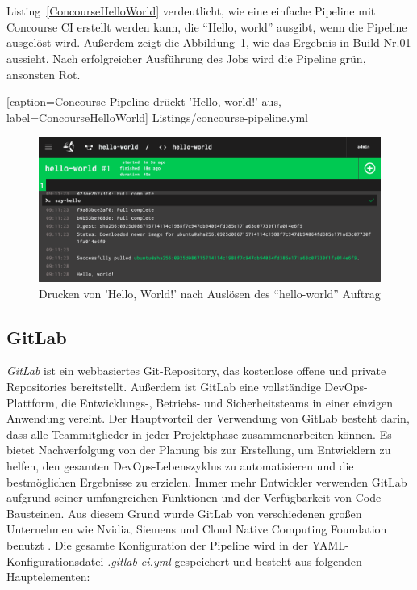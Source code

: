 \ \\\\
Listing~\ref{ConcourseHelloWorld} verdeutlicht, wie eine einfache Pipeline mit Concourse CI erstellt werden kann, die “Hello, world” ausgibt, wenn die Pipeline ausgelöst wird. Außerdem zeigt die Abbildung~\ref{fig:ConcourseHelloWorld}, wie das Ergebnis in Build Nr.01 aussieht. Nach erfolgreicher Ausführung des Jobs wird die Pipeline grün, ansonsten Rot.


[caption={Concourse-Pipeline drückt 'Hello, world!' aus}, label=ConcourseHelloWorld]
{Listings/concourse-pipeline.yml}

\begin{figure}[!htbp]%
	\centering
	\includegraphics[width=1.0\textwidth]{Graphics/concourse-ci-job-success.png}
	\caption{Drucken von 'Hello, World!' nach Auslösen des “hello-world” Auftrag}
	\label{fig:ConcourseHelloWorld}
\end{figure}

\subsection{GitLab}\label{sub:gitlab}

\textit{GitLab} ist ein webbasiertes Git-Repository, das kostenlose offene und private Repositories bereitstellt. 
Außerdem ist GitLab eine vollständige DevOps-Plattform, die Entwicklungs-, Betriebs- und Sicherheitsteams in einer einzigen Anwendung vereint. Der Hauptvorteil der Verwendung von GitLab besteht darin, dass alle Teammitglieder in jeder Projektphase zusammenarbeiten können. Es bietet Nachverfolgung von der Planung bis zur Erstellung, um Entwicklern zu helfen, den gesamten DevOps-Lebenszyklus zu automatisieren und die bestmöglichen Ergebnisse zu erzielen. Immer mehr Entwickler verwenden GitLab aufgrund seiner umfangreichen Funktionen und der Verfügbarkeit von Code-Bausteinen. Aus diesem Grund wurde GitLab von verschiedenen großen Unternehmen wie Nvidia, Siemens und Cloud Native Computing Foundation benutzt \cite{GitLab:about}. 
\newline \newline
Die gesamte Konfiguration der Pipeline wird in der YAML-Konfigurationsdatei \textit{.gitlab-ci.yml} gespeichert und besteht aus folgenden Hauptelementen:

